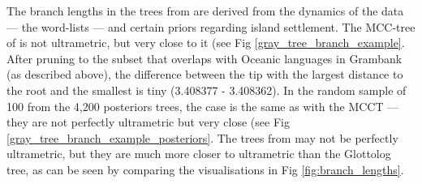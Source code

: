 \documentclass[12pt,letterpaper]{article}
\begin{document}
The branch lengths in the trees from \citet{grayetal_2009} are derived from the dynamics of the data --- the word-lists --- and certain priors regarding island settlement. The MCC-tree of \citet{grayetal_2009} is not ultrametric, but very close to it (see Fig \ref{gray_tree_branch_example}. After pruning to the subset that overlaps with Oceanic languages in Grambank (as described above), the difference between the tip with the largest distance to the root and the smallest is tiny (3.408377 -  3.408362). In the random sample of 100 from the 4,200 posteriors trees, the case is the same as with the MCCT --- they are not perfectly ultrametric but very close (see Fig \ref{gray_tree_branch_example_posteriors}. The trees from \citet{grayetal_2009} may not be perfectly ultrametric, but they are much more closer to ultrametric than the Glottolog tree, as can be seen by comparing the visualisations in Fig \ref{fig:branch_lengths}.
\end{document}
